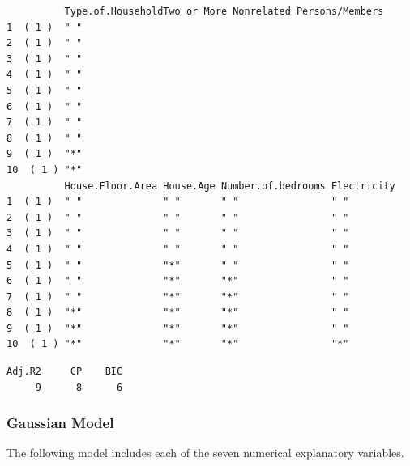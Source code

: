 \documentclass[
]{article}
\begin{document}
\begin{verbatim}
          Type.of.HouseholdTwo or More Nonrelated Persons/Members
1  ( 1 )  " "                                                    
2  ( 1 )  " "                                                    
3  ( 1 )  " "                                                    
4  ( 1 )  " "                                                    
5  ( 1 )  " "                                                    
6  ( 1 )  " "                                                    
7  ( 1 )  " "                                                    
8  ( 1 )  " "                                                    
9  ( 1 )  "*"                                                    
10  ( 1 ) "*"                                                    
          House.Floor.Area House.Age Number.of.bedrooms Electricity
1  ( 1 )  " "              " "       " "                " "        
2  ( 1 )  " "              " "       " "                " "        
3  ( 1 )  " "              " "       " "                " "        
4  ( 1 )  " "              " "       " "                " "        
5  ( 1 )  " "              "*"       " "                " "        
6  ( 1 )  " "              "*"       "*"                " "        
7  ( 1 )  " "              "*"       "*"                " "        
8  ( 1 )  "*"              "*"       "*"                " "        
9  ( 1 )  "*"              "*"       "*"                " "        
10  ( 1 ) "*"              "*"       "*"                "*"        
\end{verbatim}

\begin{verbatim}
Adj.R2     CP    BIC 
     9      8      6 
\end{verbatim}

\hypertarget{gaussian-model}{%
\subsubsection{Gaussian Model}\label{gaussian-model}}

The following model includes each of the seven numerical explanatory
variables.
\end{document}
